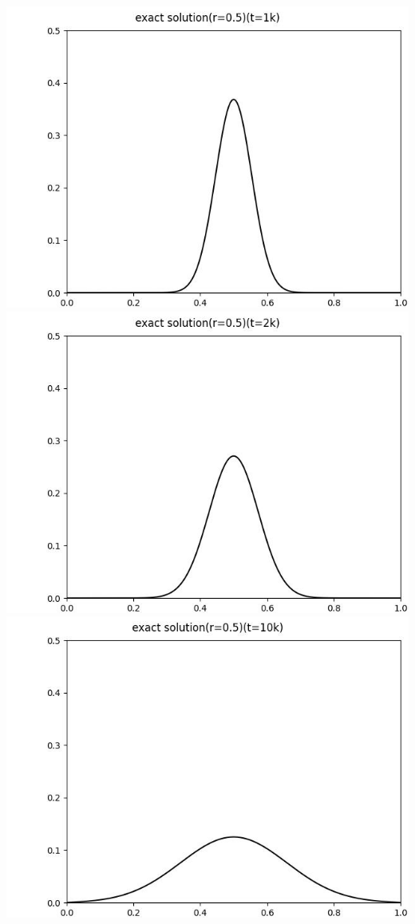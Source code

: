 \documentclass[12pt]{ctexart}
\begin{document}
\includegraphics[scale=0.35]{exact solution(r=0.5)(t=1k).jpg}
\includegraphics[scale=0.35]{exact solution(r=0.5)(t=2k).jpg}
\includegraphics[scale=0.35]{exact solution(r=0.5)(t=10k).jpg}
\end{document}
